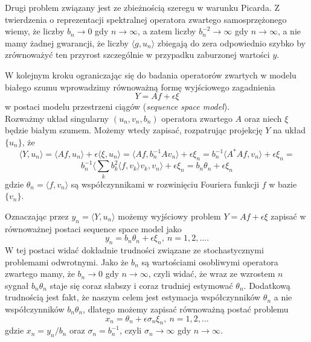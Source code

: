 \documentclass{article}
\begin{document}
Drugi problem związany jest ze zbieżnością szeregu w warunku Picarda. Z twierdzenia o reprezentacji spektralnej operatora zwartego samosprzężonego wiemy, że liczby $b_n\to 0$ gdy $n\to \infty$, a zatem liczby $b_n^{-2}\to \infty$ gdy $n \to \infty$, a nie mamy żadnej gwarancji, że liczby $\langle g,u_n\rangle$ zbiegają do zera odpowiednio szybko by zrównoważyć ten przyrost szczególnie w przypadku zaburzonej wartości $y$.


W kolejnym kroku ograniczając się do badania operatorów zwartych w modelu białego szumu wprowadzimy równoważną formę wyjściowego zagadnienia 
\begin{displaymath}
Y=Af+\epsilon\xi
\end{displaymath}
w postaci modelu przestrzeni ciągów (\textit{sequence space model}).\\

Rozważmy układ singularny $(u_n,v_n,b_n)$ operatora zwartego $A$ oraz niech $\xi$ będzie białym szumem. Możemy wtedy zapisać, rozpatrując projekcję $Y$ na układ $\{u_n\}$, że
\begin{displaymath}
\langle Y,u_n\rangle=\langle Af,u_n\rangle +\epsilon\langle \xi, u_n\rangle=\langle Af,b_n^{-1}Av_n\rangle+\epsilon \xi_n=b_n^{-1}\langle A^*Af, v_n\rangle+\epsilon \xi_n=
\end{displaymath}
\begin{displaymath}
b_n^{-1}\langle \sum_kb_k^2\langle f, v_k\rangle v_k, v_n\rangle +\epsilon\xi_n=b_n\theta_n+\epsilon\xi_n
\end{displaymath}
gdzie $\theta_n=\langle f,v_n\rangle$ są współczynnikami w rozwinięciu Fouriera funkcji $f$ w bazie $\{v_n\}$. 

Oznaczając przez $y_n=\langle Y,u_n\rangle$ możemy wyjściowy problem $Y=Af+\epsilon\xi$ zapisać w równoważnej postaci sequence space model jako
\begin{displaymath}
y_n=b_n\theta_n+\epsilon\xi_n,\ n=1,2,\dots.
\end{displaymath}
W tej postaci widać dokładnie trudności związane ze stochastycznymi problemami odwrotnymi. Jako że $b_n$ są wartościami osobliwymi operatora zwartego mamy, że $b_n\to 0$ gdy $n\to \infty$, czyli widać, że wraz ze wzrostem $n$ sygnał $b_n\theta_n$ staje się coraz słabszy i coraz trudniej estymować $\theta_n$. Dodatkową trudnością jest fakt, że naszym celem jest estymacja współczynników $\theta_n$ a nie współczynników $b_n\theta_n$, dlatego możemy zapisać równoważną postać problemu
\begin{equation}\label{ssm}
x_n=\theta_n+\epsilon\sigma_n\xi_n,\ n=1,2,\dots
\end{equation}
gdzie $x_n=y_n/b_n$ oraz $\sigma_n=b_n^{-1}$, czyli $\sigma_n\to \infty$ gdy $n\to \infty$. \\
\end{document}
